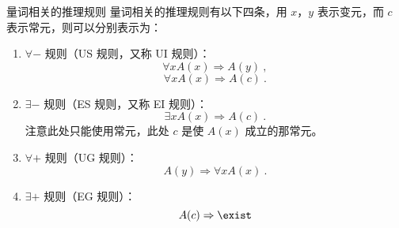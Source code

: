 


\begin{definition}{量词相关的推理规则}
量词相关的推理规则有以下四条，用 $x$，$y$ 表示变元，而 $c$ 表示常元，则可以分别表示为：
\begin{enumerate}
\item $\forall -$ 规则（US 规则，又称 UI 规则）：
\begin{equation}
\forall x A(x) \Rightarrow A(y) ~,
\end{equation}
\begin{equation}
\forall x A(x) \Rightarrow A(c) ~.
\end{equation}
\item $\exists -$ 规则（ES 规则，又称 EI 规则）：
\begin{equation}
\exists x A(x) \Rightarrow A(c) ~.
\end{equation}
注意此处只能使用常元，此处 $c$ 是使 $A(x)$ 成立的那常元。

\item $\forall +$ 规则（UG 规则）：
\begin{equation}
A(y) \Rightarrow \forall x A(x) ~.
\end{equation}

\item $\exists +$ 规则（EG 规则）：
\begin{equation}
A(c) \Rightarrow \exist
\end{equation}


\end{enumerate}

\end{definition}